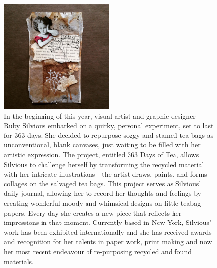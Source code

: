  \begin{figure}[h!]
      \centering
      \includegraphics[width=0.5\textwidth]{graphics/rubysilvious-teabag-Day237.jpg}
      \caption[Ruby Silvious, 363 Days of Tea, Day 237, 2015, Mixed media on upcycled paper tea bags, Dimensions Variable]{In the beginning of this year, visual artist and graphic designer Ruby Silvious embarked on a quirky, personal experiment, set to last for 363 days. She decided to repurpose soggy and stained tea bags as unconventional, blank canvases, just waiting to be filled with her artistic expression. The project, entitled 363 Days of Tea, allows Silvious to challenge herself by transforming the recycled material with her intricate illustrations—the artist draws, paints, and forms collages on the salvaged tea bags. This project serves as Silvious’ daily journal, allowing her to record her thoughts and feelings by creating wonderful moody and whimsical designs on little teabag papers. Every day she creates a new piece that reflects her impressions in that moment. Currently based in New York, Silvious’ work has been exhibited internationally and she has received awards and recognition for her talents in paper work, print making and now her most recent endeavour of re-purposing recycled and found materials.}
      \label{fig:RubySilvious_TeaBag}
  \end{figure}



